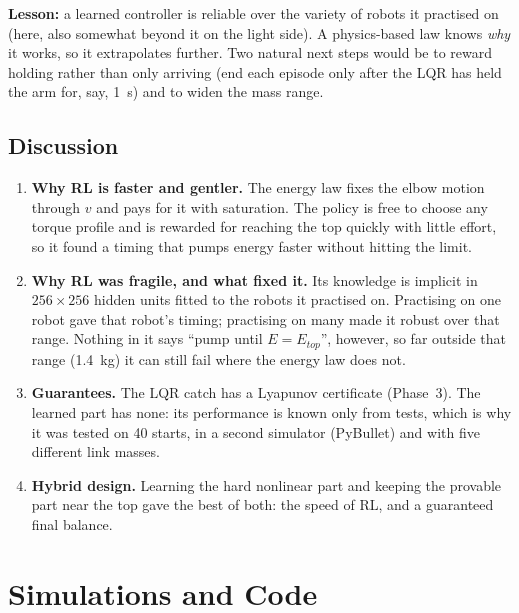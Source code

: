 \documentclass[12pt,a4paper]{article}
\begin{document}
\textbf{Lesson:} a learned controller is reliable over the variety of robots it practised on (here, also somewhat beyond it on the light side). A physics-based law knows \emph{why} it works, so it extrapolates further. Two natural next steps would be to reward holding rather than only arriving (end each episode only after the LQR has held the arm for, say, 1~s) and to widen the mass range.

\subsection{Discussion}
\begin{enumerate}
\item \textbf{Why RL is faster and gentler.} The energy law fixes the elbow motion through $v$ and pays for it with saturation. The policy is free to choose any torque profile and is rewarded for reaching the top quickly with little effort, so it found a timing that pumps energy faster without hitting the limit.
\item \textbf{Why RL was fragile, and what fixed it.} Its knowledge is implicit in $256\times256$ hidden units fitted to the robots it practised on. Practising on one robot gave that robot's timing; practising on many made it robust over that range. Nothing in it says ``pump until $E=E_{top}$'', however, so far outside that range (1.4~kg) it can still fail where the energy law does not.
\item \textbf{Guarantees.} The LQR catch has a Lyapunov certificate (Phase~3). The learned part has none: its performance is known only from tests, which is why it was tested on 40 starts, in a second simulator (PyBullet) and with five different link masses.
\item \textbf{Hybrid design.} Learning the hard nonlinear part and keeping the provable part near the top gave the best of both: the speed of RL, and a guaranteed final balance.
\end{enumerate}
\section{Simulations and Code}
\end{document}
